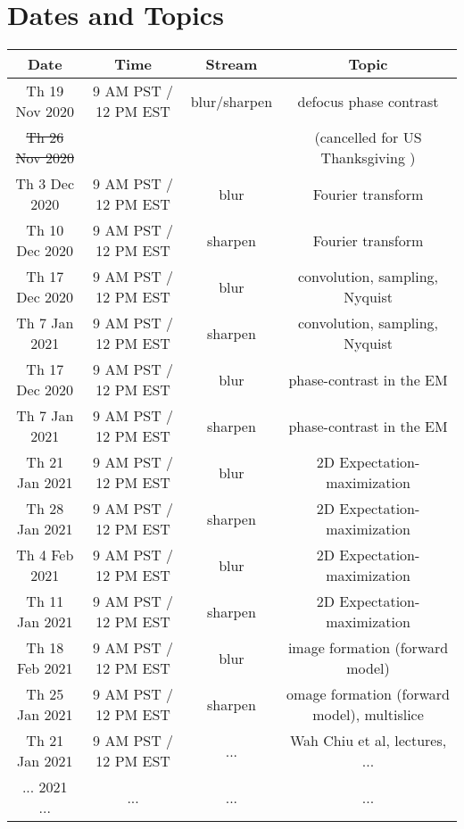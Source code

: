 \documentclass[11pt, oneside]{article}   	%
\begin{document}
\section{Dates and Topics}

\begin{center}
\small
 \begin{tabular}{|| c c c c||} 
 \hline
 Date & Time & Stream & Topic \\ [0.5ex] 
 \hline\hline
Th 19 Nov 2020 & \tiny{9 AM PST / 12 PM EST} &  blur/sharpen & defocus phase contrast  \\ 
 \hline
\sout{Th 26 Nov 2020}  &   & & (cancelled for US Thanksgiving )    \\ 
 \hline
Th 3 Dec 2020 & \tiny{9 AM PST / 12 PM EST} & blur & Fourier transform   \\ 
 \hline
Th 10 Dec 2020 & \tiny{9 AM PST / 12 PM EST} & sharpen & Fourier transform   \\ 
 \hline
Th 17 Dec 2020 & \tiny{9 AM PST / 12 PM EST} & blur & convolution, sampling, Nyquist   \\ 
 \hline
Th 7 Jan 2021 & \tiny{9 AM PST / 12 PM EST} & sharpen & convolution, sampling, Nyquist   \\ 
 \hline
Th 17 Dec 2020 & \tiny{9 AM PST / 12 PM EST} & blur & phase-contrast in the EM   \\ 
 \hline
Th 7 Jan 2021 & \tiny{9 AM PST / 12 PM EST} & sharpen & phase-contrast in the EM   \\ 
 \hline
Th 21 Jan 2021 & \tiny{9 AM PST / 12 PM EST} & blur & 2D Expectation-maximization   \\ 
 \hline
Th 28 Jan 2021 & \tiny{9 AM PST / 12 PM EST} & sharpen & 2D Expectation-maximization   \\ 
 \hline
Th 4 Feb 2021 & \tiny{9 AM PST / 12 PM EST} & blur & 2D Expectation-maximization   \\ 
 \hline
Th 11 Jan 2021 & \tiny{9 AM PST / 12 PM EST} & sharpen & 2D Expectation-maximization   \\ 
 \hline
Th 18 Feb 2021 & \tiny{9 AM PST / 12 PM EST} & blur & image formation (forward model)   \\ 
 \hline
Th 25 Jan 2021 & \tiny{9 AM PST / 12 PM EST} & sharpen & omage formation (forward model), multislice  \\  
 \hline
Th 21 Jan 2021 & \tiny{9 AM PST / 12 PM EST} & ... & Wah Chiu et al, lectures, ...  \\ [1ex] 
 \hline
 ... 2021 ... & ... &  ... & ...  \\ 
 \hline
\end{tabular}
\end{center}
\end{document}
